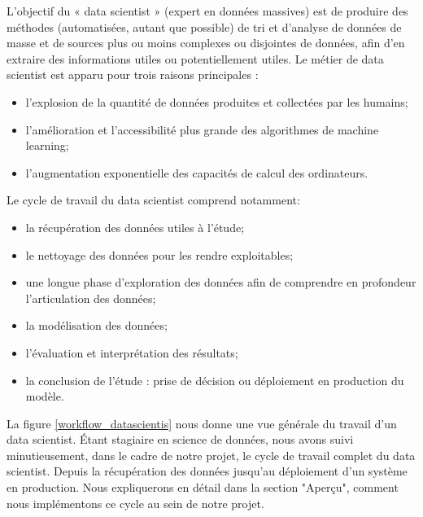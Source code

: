 \documentclass[12pt, french]{report}
\begin{document}
L'objectif du « data scientist » (expert en données massives) est de produire des méthodes (automatisées, autant que possible) de tri et d'analyse de données de masse et de sources plus ou moins complexes ou disjointes de données, afin d'en extraire des informations utiles ou potentiellement utiles. 
Le métier de data scientist est apparu pour trois raisons principales \cite{key6} :	
\begin{itemize}
\item l'explosion de la quantité de données produites et collectées par les humains;
\item 	l'amélioration et l'accessibilité plus grande des algorithmes de machine learning;
\item l'augmentation exponentielle des capacités de calcul des ordinateurs.\\
\end{itemize}	
Le cycle de travail du data scientist comprend notamment:
\begin{itemize}
\item la récupération des données utiles à l'étude;
\item le nettoyage des données pour les rendre exploitables;
\item une longue phase d'exploration des données afin de comprendre en profondeur l'articulation des données;
\item la modélisation des données;
\item l'évaluation et interprétation des résultats;
\item  la conclusion de l'étude : prise de décision ou déploiement en production du modèle.
\end{itemize}
La figure \ref{workflow_datascientis}  nous donne une vue générale du travail d'un data scientist. Étant stagiaire en science de données, nous avons suivi minutieusement, dans le cadre de notre projet, le cycle de travail complet du data scientist. Depuis la récupération des données jusqu'au déploiement d'un système en production. Nous expliquerons en détail dans la section "Aperçu", comment nous implémentons ce cycle au sein de notre projet. \\ \\
\end{document}
